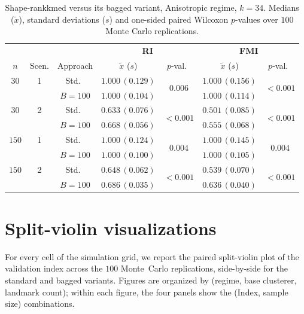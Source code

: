 \documentclass[11pt,a4paper]{article}
\begin{document}
\begin{table}[h]
\centering
\caption{Shape-rankkmed versus its bagged variant, Anisotropic regime, $k=34$. Medians ($\tilde x$), standard deviations ($s$) and one-sided paired Wilcoxon $p$-values over $100$ Monte Carlo replications.}
\label{tab:rkm-aniso-k34}
\footnotesize
\begin{tabular}{cc c cc cc}
\toprule
& & & \multicolumn{2}{c}{\textbf{RI}} & \multicolumn{2}{c}{\textbf{FMI}} \\
\cmidrule(lr){4-5}\cmidrule(lr){6-7}
$n$ & Scen. & Approach & $\tilde x$ ($s$) & $p$-val.\ & $\tilde x$ ($s$) & $p$-val.\ \\
\midrule
$30$ & 1 & Std.\ & $1.000\,(0.129)$ & \multirow{2}{*}{$\mathbf{0.006}$} & $1.000\,(0.156)$ & \multirow{2}{*}{$\mathbf{<\!0.001}$} \\
     &   & $B{=}100$ & $1.000\,(0.104)$ & & $1.000\,(0.114)$ & \\
$30$ & 2 & Std.\ & $0.633\,(0.076)$ & \multirow{2}{*}{$\mathbf{<\!0.001}$} & $0.501\,(0.085)$ & \multirow{2}{*}{$\mathbf{<\!0.001}$} \\
     &   & $B{=}100$ & $0.668\,(0.056)$ & & $0.555\,(0.068)$ & \\
$150$ & 1 & Std.\ & $1.000\,(0.124)$ & \multirow{2}{*}{$\mathbf{0.004}$} & $1.000\,(0.145)$ & \multirow{2}{*}{$\mathbf{0.004}$} \\
     &   & $B{=}100$ & $1.000\,(0.100)$ & & $1.000\,(0.105)$ & \\
$150$ & 2 & Std.\ & $0.648\,(0.062)$ & \multirow{2}{*}{$\mathbf{<\!0.001}$} & $0.539\,(0.070)$ & \multirow{2}{*}{$\mathbf{<\!0.001}$} \\
     &   & $B{=}100$ & $0.686\,(0.035)$ & & $0.636\,(0.040)$ & \\
\bottomrule
\end{tabular}
\end{table}


\clearpage

\section{Split-violin visualizations}
\label{sec:violins}

For every cell of the simulation grid, we report the paired split-violin
plot of the validation index across the $100$ Monte~Carlo replications,
side-by-side for the standard and bagged variants. Figures are organized
by (regime, base clusterer, landmark count); within each figure, the four
panels show the (Index, sample size) combinations.
\end{document}
